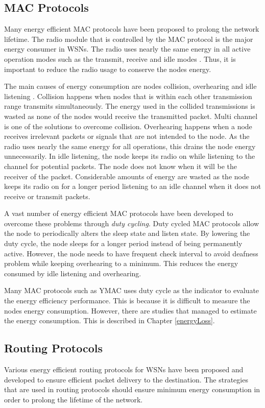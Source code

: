 \subsection{MAC Protocols}
Many energy efficient MAC protocols have been proposed to prolong the network lifetime. The radio module that is controlled by the MAC protocol is the major energy consumer in WSNs. The radio uses nearly the same energy in all active operation modes such as the transmit, receive and idle modes \cite{alexlifetime}. Thus, it is important to reduce the radio usage to conserve the nodes energy.

The main causes of energy consumption are nodes collision, overhearing and idle listening \cite{macsurvey, pwmac}. Collision happens when nodes that is within each other transmission range transmits simultaneously. The energy used in the collided transmissions is wasted as none of the nodes would receive the transmitted packet. Multi channel is one of the solutions to overcome collision. Overhearing happens when a node receives irrelevant packets or signals that are not intended to the node. As the radio uses nearly the same energy for all operations, this drains the node energy unnecessarily. In idle listening, the node keeps its radio on while listening to the channel for potential packets. The node does not know when it will be the receiver of the packet. Considerable amounts of energy are wasted as the node keeps its radio on for a longer period listening to an idle channel when it does not receive or transmit packets. 

A vast number of energy efficient MAC protocols have been developed to overcome these problems through \textit{duty cycling}. Duty cycled MAC protocols allow the node to periodically alters the sleep state and listen state. By lowering the duty cycle, the node sleeps for a longer period instead of being permanently active. However, the node needs to have frequent check interval to avoid deafness problem while keeping overhearing to a minimum. This reduces the energy consumed by idle listening and overhearing.

Many MAC protocols such as YMAC \cite{y-mac} uses duty cycle as the indicator to evaluate the energy efficiency performance. This is because it is difficult to measure the nodes energy consumption. However, there are studies that managed to estimate the energy consumption. This is described in Chapter \ref{energyLoss}.

\subsection{Routing Protocols}
Various energy efficient routing protocols for WSNs have been proposed and developed to ensure efficient packet delivery to the destination. The strategies that are used in routing protocols should ensure minimum energy consumption in order to prolong the lifetime of the network. 

